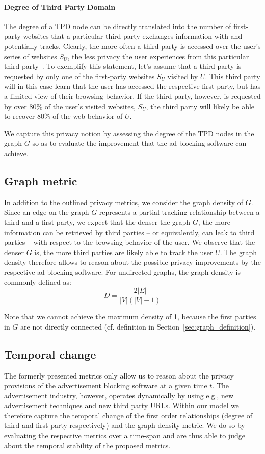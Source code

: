 \paragraph{Degree of Third Party Domain}
The degree of a TPD node can be directly translated into the number of first-party websites that a particular third party exchanges information with and potentially tracks. Clearly, the more often a third party is accessed over the user's series of websites $S_U$, the less privacy the user experiences from this particular third party~\cite{englehardt}. To exemplify this statement, let's assume that a third party is requested by only one of the first-party websites $S_U$ visited by $U$. This third party will in this case learn that the user has accessed the respective first party, but has a limited view of their browsing behavior. If the third party, however, is requested by over 80\% of the user's visited websites, $S_U$, the third party will likely be able to recover 80\% of the web behavior of $U$.

We capture this privacy notion by assessing the degree of the TPD nodes in the graph $G$ so as to evaluate the improvement that the ad-blocking software can achieve.

\subsection{Graph metric}
In addition to the outlined privacy metrics, we consider the graph density of $G$. Since an edge on the graph $G$ represents a partial tracking relationship between a third and a first party, we expect that the denser the graph $G$, the more information can be retrieved by third parties -- or equivalently, can leak to third parties -- with respect to the browsing behavior of the user. We observe that the denser $G$ is, the more third parties are likely able to track the user $U$. The graph density therefore allows to reason about the possible privacy improvements by the respective ad-blocking software. For undirected graphs, the graph density is commonly defined as:
\begin{equation}
\label{eq:density}
D = \frac{2 |E|}{|V|(|V|-1)}
\end{equation}

Note that we cannot achieve the maximum density of 1, because the first parties in $G$ are not directly connected (cf. definition in Section~\ref{sec:graph_definition}).

\subsection{Temporal change}
The formerly presented metrics only allow us to reason about the privacy provisions of the advertisement blocking software at a given time $t$. The advertisement industry, however, operates dynamically by using e.g., new advertisement techniques and new third party URLs. Within our model we therefore capture the temporal change of the first order relationships (degree of third and first party respectively) and the graph density metric. We do so by evaluating the respective metrics over a time-span and are thus able to judge about the temporal stability of the proposed metrics.

